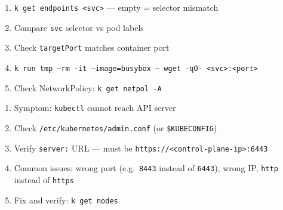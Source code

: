 \begin{tcbitemize}[
  raster columns=3, raster equal height=rows,
  blanker, cheat subtitle
]
\begin{tcbitemize}[
      raster columns=1, raster equal height=rows,
      blanker, cheat subtitle
    ]
      \tcbitem
          {\fontsize{6.5}{7.5}\selectfont\sffamily
          \begin{enumerate}[leftmargin=1.2em, itemsep=0pt, parsep=0pt, topsep=1pt]
            \item \texttt{k get endpoints <svc>} — empty = selector mismatch
            \item Compare \texttt{svc} selector vs pod labels
            \item Check \texttt{targetPort} matches container port
            \item \texttt{k run tmp --rm -it --image=busybox -- wget -qO- <svc>:<port>}
            \item Check NetworkPolicy: \texttt{k get netpol -A}
          \end{enumerate}}

      \tcbitem
          {\fontsize{6.5}{7.5}\selectfont\sffamily
          \begin{enumerate}[leftmargin=1.2em, itemsep=0pt, parsep=0pt, topsep=1pt]
            \item Symptom: \texttt{kubectl} cannot reach API server
            \item Check \texttt{/etc/kubernetes/admin.conf} (or \texttt{\$KUBECONFIG})
            \item Verify \texttt{server:} URL — must be \texttt{https://<control-plane-ip>:6443}
            \item Common issues: wrong port (e.g.\ \texttt{8443} instead of \texttt{6443}), wrong IP, \texttt{http} instead of \texttt{https}
            \item Fix and verify: \texttt{k get nodes}
          \end{enumerate}}

    \end{tcbitemize}

\end{tcbitemize}
